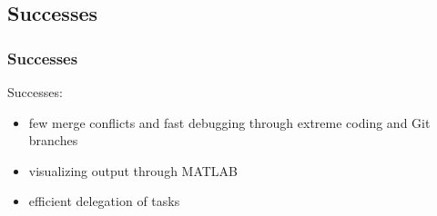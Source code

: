 \documentclass[usernames,dvipsnames]{beamer}
\begin{document}
\subsection{Successes}

\begin{frame}	
	\frametitle{Successes}
	
	\begin{exampleblock}{Successes:}
		\begin{itemize}
			\item few merge conflicts and fast debugging through extreme coding and Git branches
			\item visualizing output through MATLAB
			\item efficient delegation of tasks
		\end{itemize}
	\end{exampleblock}

\end{frame}
\end{document}
